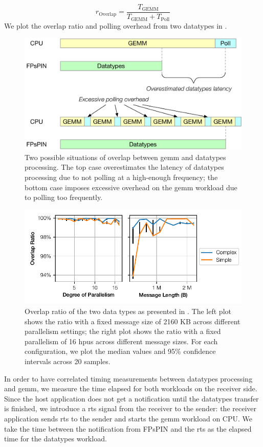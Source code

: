 \[
r_\text{Overlap} = \frac{T_{\text{GEMM}}}{T_{\text{GEMM}} + T_{\text{Poll}}}
\]
We plot the overlap ratio and polling overhead from two datatypes in .

\begin{figure}[tp]
    \centering
    \includegraphics[width=.8\textwidth]{figures/datatypes-tune-goal.pdf}
    \caption{Two possible situations of overlap between \ac{gemm} and datatypes processing.  The top case overestimates the latency of datatypes processing due to not polling at a high-enough frequency; the bottom case imposes excessive overhead on the \ac{gemm} workload due to polling too frequently.} \label{fig:datatypes-tuning-goal}
\end{figure}

\begin{figure}[tp]
    \centering
    \includegraphics{figures/datatypes-overlap.pdf}
    \caption{Overlap ratio of the two data types as presented in .  The left plot shows the ratio with a fixed message size of 2160 KB across different parallelism settings; the right plot shows the ratio with a fixed parallelism of 16 \ac{hpu}s across different message sizes.  For each configuration, we plot the median values and 95\% confidence intervals across 20 samples.} \label{fig:datatypes-overlap}
\end{figure}

In order to have correlated timing measurements between datatypes processing and \ac{gemm}, we measure the time elapsed for both workloads on the receiver side.  Since the host application does not get a notification until the datatypes transfer is finished, we introduce a \ac{rts} signal from the receiver to the sender: the receiver application sends \ac{rts} to the sender and starts the \ac{gemm} workload on CPU.  We take the time between the notification from FPsPIN and the \ac{rts} as the elapsed time for the datatypes workload.

